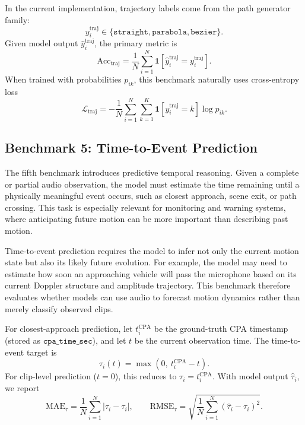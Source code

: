\documentclass{article}
\begin{document}
In the current implementation, trajectory labels come from the path generator family:
\begin{equation}
  y_i^{\text{traj}}\in\{\texttt{straight},\texttt{parabola},\texttt{bezier}\}.
\end{equation}
Given model output \(\hat y_i^{\text{traj}}\), the primary metric is
\begin{equation}
  \mathrm{Acc}_{\text{traj}}=\frac{1}{N}\sum_{i=1}^{N}\mathbf{1}\!\left[\hat y_i^{\text{traj}}=y_i^{\text{traj}}\right].
\end{equation}
When trained with probabilities \(p_{ik}\), this benchmark naturally uses cross-entropy loss
\begin{equation}
  \mathcal{L}_{\text{traj}}=-\frac{1}{N}\sum_{i=1}^{N}\sum_{k=1}^{K}\mathbf{1}[y_i^{\text{traj}}=k]\log p_{ik}.
\end{equation}

\subsection{Benchmark 5: Time-to-Event Prediction}

The fifth benchmark introduces predictive temporal reasoning. Given a complete or partial audio observation, the model must estimate the time remaining until a physically meaningful event occurs, such as closest approach, scene exit, or path crossing. This task is especially relevant for monitoring and warning systems, where anticipating future motion can be more important than describing past motion.

Time-to-event prediction requires the model to infer not only the current motion state but also its likely future evolution. For example, the model may need to estimate how soon an approaching vehicle will pass the microphone based on its current Doppler structure and amplitude trajectory. This benchmark therefore evaluates whether models can use audio to forecast motion dynamics rather than merely classify observed clips.

For closest-approach prediction, let \(t_i^{\mathrm{CPA}}\) be the ground-truth CPA timestamp (stored as \(\texttt{cpa\_time\_sec}\)), and let \(t\) be the current observation time. The time-to-event target is
\begin{equation}
  \tau_i(t)=\max\!\left(0,\ t_i^{\mathrm{CPA}}-t\right).
\end{equation}
For clip-level prediction (\(t=0\)), this reduces to \(\tau_i=t_i^{\mathrm{CPA}}\). With model output \(\hat\tau_i\), we report
\begin{equation}
  \mathrm{MAE}_{\tau}=\frac{1}{N}\sum_{i=1}^{N}\left|\hat\tau_i-\tau_i\right|,
  \qquad
  \mathrm{RMSE}_{\tau}=\sqrt{\frac{1}{N}\sum_{i=1}^{N}\left(\hat\tau_i-\tau_i\right)^2}.
\end{equation}
\end{document}

